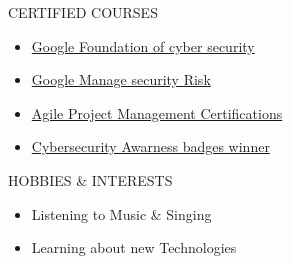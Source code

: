 \documentclass{resume}
\begin{document}
\begin{rSection}{CERTIFIED COURSES}
    \begin{itemize}
        \item \href{https://coursera.org/share/dc5df20e6dc55a6b8b97cd5bc2d5d927}{Google Foundation of cyber security}
        \item \href{https://coursera.org/share/f75c0a81532aebe121347db41be1d9e5}{Google Manage security Risk}
        \item \href{https://coursera.org/share/ae0e32c17961f344ea9a2e872c30deae}{Agile Project Management Certifications}
        \item \href{https://app.kajabi.com/certificates/1d00b4fe}{Cybersecurity Awarness badges winner}
    \end{itemize}
    \vspace{-0.4em}
\end{rSection}

\begin{rSection}{HOBBIES \& INTERESTS}
    \begin{itemize}
        \item Listening to Music \& Singing
              \vspace{-0.4em}
        \item Learning about new Technologies
    \end{itemize}
\end{rSection}
\vspace{-0.4em}

\end{document}
